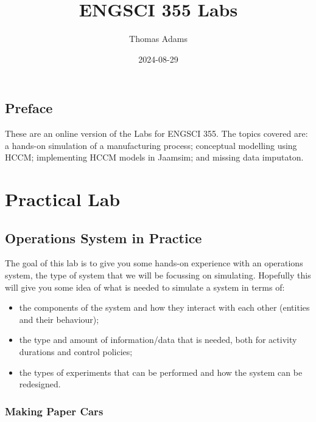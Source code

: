 \documentclass[
  10pt,
  a4paperpaper,
  DIV=11,
  numbers=noendperiod,
  oneside]{scrreprt}
\title{ENGSCI 355 Labs}
\author{Thomas Adams}
\date{2024-08-29}
\providecommand{\tightlist}{%
  \setlength{\itemsep}{0pt}\setlength{\parskip}{0pt}}\usepackage{longtable,booktabs,array}
\renewcommand*\contentsname{Table of contents}
\newcommand\contentsname{Table of contents}
\begin{document}
\maketitle

\renewcommand*\contentsname{Table of contents}
{
\hypersetup{linkcolor=}
\setcounter{tocdepth}{2}
\tableofcontents
}


\chapter*{Preface}\label{preface}


These are an online version of the Labs for ENGSCI 355. The topics
covered are: a hands-on simulation of a manufacturing process;
conceptual modelling using HCCM; implementing HCCM models in Jaamsim;
and missing data imputaton.

\part{Practical Lab}

\chapter{Operations System in Practice}\label{sec-hands-on-sim}

The goal of this lab is to give you some hands-on experience with an
operations system, the type of system that we will be focussing on
simulating. Hopefully this will give you some idea of what is needed to
simulate a system in terms of:

\begin{itemize}
\tightlist
\item
  the components of the system and how they interact with each other
  (entities and their behaviour);
\item
  the type and amount of information/data that is needed, both for
  activity durations and control policies;
\item
  the types of experiments that can be performed and how the system can
  be redesigned.
\end{itemize}

\section{Making Paper Cars}\label{making-paper-cars}
\end{document}
